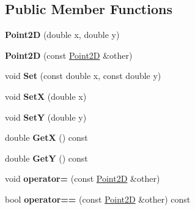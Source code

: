 \subsection*{Public Member Functions}
\begin{DoxyCompactItemize}
\item 
{\bfseries Point2D} (double x, double y)\hypertarget{class_point2_d_ac9d8daeb64c1e93325c7868d42da6e44}{}\label{class_point2_d_ac9d8daeb64c1e93325c7868d42da6e44}

\item 
{\bfseries Point2D} (const \hyperlink{class_point2_d}{Point2D} \&other)\hypertarget{class_point2_d_a0c7330a979e83d7de8253089d201cdd3}{}\label{class_point2_d_a0c7330a979e83d7de8253089d201cdd3}

\item 
void {\bfseries Set} (const double x, const double y)\hypertarget{class_point2_d_a9b256ee317e41ab97d0214ec0e9ed6ad}{}\label{class_point2_d_a9b256ee317e41ab97d0214ec0e9ed6ad}

\item 
void {\bfseries SetX} (double x)\hypertarget{class_point2_d_ae2c20141053387e138970b8b3585e9a2}{}\label{class_point2_d_ae2c20141053387e138970b8b3585e9a2}

\item 
void {\bfseries SetY} (double y)\hypertarget{class_point2_d_a446a5d31f7dd7ed665381fc466c707ff}{}\label{class_point2_d_a446a5d31f7dd7ed665381fc466c707ff}

\item 
double {\bfseries GetX} () const \hypertarget{class_point2_d_aee760e0f9996f2bc71fa873c57871e0a}{}\label{class_point2_d_aee760e0f9996f2bc71fa873c57871e0a}

\item 
double {\bfseries GetY} () const \hypertarget{class_point2_d_ac30d12c0468c1f81b6939edd3941ae7d}{}\label{class_point2_d_ac30d12c0468c1f81b6939edd3941ae7d}

\item 
void {\bfseries operator=} (const \hyperlink{class_point2_d}{Point2D} \&other)\hypertarget{class_point2_d_a04cb5cef87b3f800a3bdd3eb6dc2df0c}{}\label{class_point2_d_a04cb5cef87b3f800a3bdd3eb6dc2df0c}

\item 
bool {\bfseries operator==} (const \hyperlink{class_point2_d}{Point2D} \&other) const \hypertarget{class_point2_d_a6f7fa7062dfa577e45dc6d4dd38c1e89}{}\label{class_point2_d_a6f7fa7062dfa577e45dc6d4dd38c1e89}


\end{DoxyCompactItemize}
